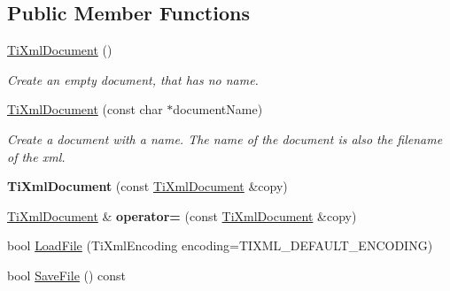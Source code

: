 \subsection*{\-Public \-Member \-Functions}
\begin{DoxyCompactItemize}
\item 
\hypertarget{class_ti_xml_document_a9f5e84335708fde98400230f9f12659c}{\hyperlink{class_ti_xml_document_a9f5e84335708fde98400230f9f12659c}{\-Ti\-Xml\-Document} ()}\label{class_ti_xml_document_a9f5e84335708fde98400230f9f12659c}

\begin{DoxyCompactList}\small\item\em \-Create an empty document, that has no name. \end{DoxyCompactList}\item 
\hypertarget{class_ti_xml_document_ae4508b452d0c3061db085f3db27b8396}{\hyperlink{class_ti_xml_document_ae4508b452d0c3061db085f3db27b8396}{\-Ti\-Xml\-Document} (const char $\ast$document\-Name)}\label{class_ti_xml_document_ae4508b452d0c3061db085f3db27b8396}

\begin{DoxyCompactList}\small\item\em \-Create a document with a name. \-The name of the document is also the filename of the xml. \end{DoxyCompactList}\item 
\hypertarget{class_ti_xml_document_a323a7486e7da6099cdc19a5ff7e74b07}{{\bfseries \-Ti\-Xml\-Document} (const \hyperlink{class_ti_xml_document}{\-Ti\-Xml\-Document} \&copy)}\label{class_ti_xml_document_a323a7486e7da6099cdc19a5ff7e74b07}

\item 
\hypertarget{class_ti_xml_document_aa56fd4dbe8917d2033d865909e2d737e}{\hyperlink{class_ti_xml_document}{\-Ti\-Xml\-Document} \& {\bfseries operator=} (const \hyperlink{class_ti_xml_document}{\-Ti\-Xml\-Document} \&copy)}\label{class_ti_xml_document_aa56fd4dbe8917d2033d865909e2d737e}

\item 
bool \hyperlink{class_ti_xml_document_a4c852a889c02cf251117fd1d9fe1845f}{\-Load\-File} (\-Ti\-Xml\-Encoding encoding=\-T\-I\-X\-M\-L\-\_\-\-D\-E\-F\-A\-U\-L\-T\-\_\-\-E\-N\-C\-O\-D\-I\-N\-G)
\item 
\hypertarget{class_ti_xml_document_a21c0aeb0d0a720169ad4ac89523ebe93}{bool \hyperlink{class_ti_xml_document_a21c0aeb0d0a720169ad4ac89523ebe93}{\-Save\-File} () const }\label{class_ti_xml_document_a21c0aeb0d0a720169ad4ac89523ebe93}


\end{DoxyCompactItemize}
